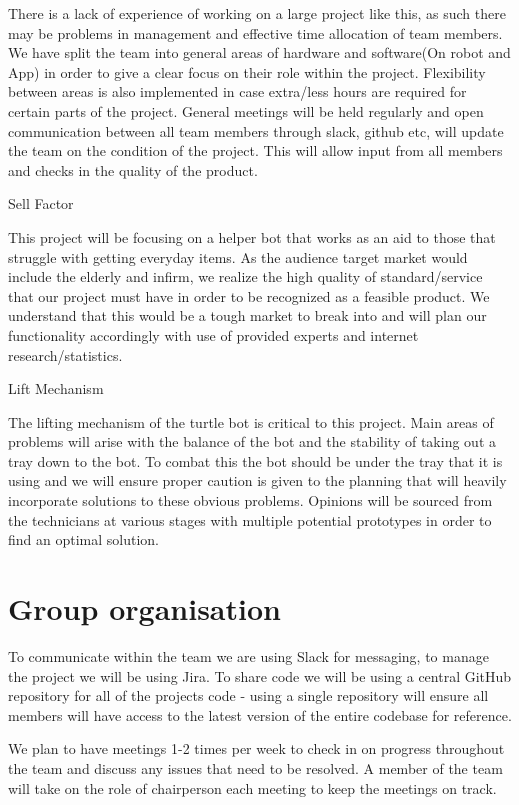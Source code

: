 \documentclass{article}
\begin{document}
There is a lack of experience of working on a large project like this, as such there may be problems in management and effective time allocation of team members. We have split the team into general areas of hardware and software(On robot and App) in order to give a clear focus on their role within the project. Flexibility between areas is also implemented in case extra/less hours are required for certain parts of the project. General meetings will be held regularly and open communication between all team members through slack, github etc, will update the team on the condition of the project. This will allow input from all members and checks in the quality of the product.

Sell Factor

This project will be focusing on a helper bot that works as an aid to those that struggle with getting everyday items. As the audience target market would include the elderly and infirm, we realize the high quality of standard/service that our project must have in order to be recognized as a feasible product. We understand that this would be a tough market to break into and will plan our functionality accordingly with use of provided experts and internet research/statistics.

Lift Mechanism

The lifting mechanism of the turtle bot is critical to this project. Main areas of problems will arise with the balance of the bot and the stability of taking out a tray down to the bot. To combat this the bot should be under the tray that it is using and we will ensure proper caution is given to the planning that will heavily incorporate solutions to these obvious problems. Opinions will be sourced from the technicians at various stages with multiple potential prototypes in order to find an optimal solution.

\section{Group organisation}

To communicate within the team we are using Slack for messaging, to manage the project we will be using Jira. To share code we will be using a central GitHub repository for all of the projects code - using a single repository will ensure all members will have access to the latest version of the entire codebase for reference.

We plan to have meetings 1-2 times per week to check in on progress throughout the team and discuss any issues that need to be resolved. A member of the team will take on the role of chairperson each meeting to keep the meetings on track. 
\end{document}
